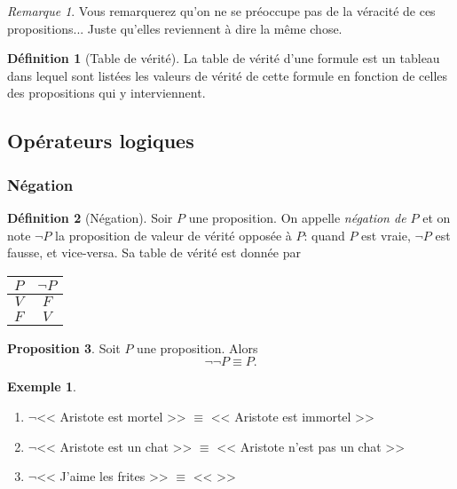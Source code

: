 \documentclass[11pt]{article}
\theoremstyle{definition}
\newtheorem{defn}{Définition}[section]
\newtheorem{prop}[defn]{Proposition}
\newtheorem{exe}{Exemple}
\theoremstyle{remark}
\newtheorem{rem}{Remarque}
\begin{document}
\begin{rem}Vous remarquerez qu'on ne se préoccupe pas de la véracité de ces propositions... Juste qu'elles reviennent à dire la même chose.
\end{rem}

\begin{defn}[Table de vérité]
La table de vérité d'une formule est un tableau dans lequel sont listées les valeurs de vérité de cette formule en fonction de celles des propositions qui y interviennent.
\end{defn}






\subsection{Opérateurs logiques}

\subsubsection{Négation}

\begin{defn}[Négation]
Soir $P$ une proposition. On appelle \textit{négation de $P$} et on note $\neg P$ la proposition de valeur de vérité opposée à $P$: quand $P$ est vraie, $\neg P$ est fausse, et vice-versa. Sa table de vérité est donnée par
\begin{center}
  \begin{tabular}{|c|c|}\hline
  $P$ & $\neg P$ \\ \hline
  $V$ & $F$ \\ \hline
  $F$ & $V$ \\ \hline
  \end{tabular}
\end{center}
\end{defn}

\begin{prop}
Soit $P$ une proposition. Alors
\[\neg\neg P \equiv P.
\]
\end{prop}

\begin{exe}\leavevmode\begin{enumerate}
\item $\neg$<< Aristote est mortel >> $\equiv$ << Aristote est immortel >>
\item $\neg$<< Aristote est un chat >> $\equiv$ << Aristote n'est pas un chat >>
\item $\neg$<< J'aime les frites >> $\equiv$ << \hspace{7cm} >>
\end{enumerate}

\end{exe}
\end{document}
